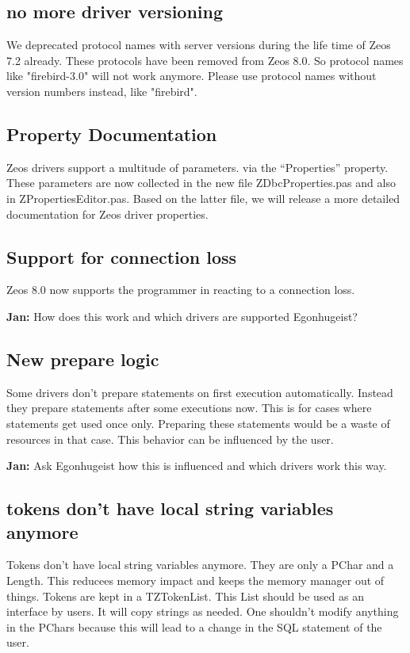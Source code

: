 \documentclass[a4paper,12pt,oneside]{article}
\begin{document}
\subsection{no more driver versioning}
We deprecated protocol names with server versions during the life time of Zeos 7.2 already.
These protocols have been removed from Zeos 8.0.
So protocol names like "firebird-3.0" will not work anymore.
Please use protocol names without version numbers instead, like "firebird".

\subsection{Property Documentation}
Zeos drivers support a multitude of parameters. via the "`Properties"' property.
These parameters are now collected in the new file ZDbcProperties.pas and also in ZPropertiesEditor.pas.
Based on the latter file, we will release a more detailed documentation for Zeos driver properties.

\subsection{Support for connection loss}
Zeos 8.0 now supports the programmer in reacting to a connection loss.

\textbf{Jan:} How does this work and which drivers are supported Egonhugeist?

\subsection{New prepare logic}
Some drivers don't prepare statements on first execution automatically.
Instead they prepare statements after some executions now.
This is for cases where statements get used once only.
Preparing these statements would be a waste of resources in that case.
This behavior can be influenced by the user.

\textbf{Jan:} Ask Egonhugeist how this is influenced and which drivers work this way.

\subsection{tokens don't have local string variables anymore}
Tokens don't have local string variables anymore.
They are only a PChar and a Length.
This reducees memory impact and keeps the memory manager out of things.
Tokens are kept in a TZTokenList.
This List should be used as an interface by users.
It will copy strings as needed.
One shouldn't modify anything in the PChars because this will lead to a change in the SQL statement of the user.
\end{document}
